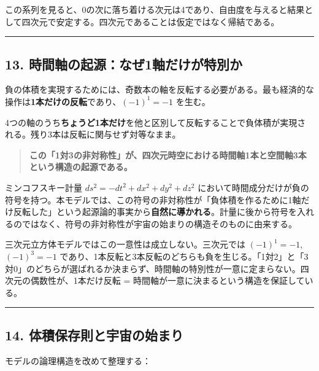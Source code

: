 \documentclass[a4paper,11pt]{ltjsarticle}
\theoremstyle{definition}
\begin{document}
この系列を見ると、0の次に落ち着ける次元は4であり、自由度を与えると結果として四次元で安定する。四次元であることは仮定ではなく帰結である。

\begin{center}\rule{0.5\linewidth}{0.5pt}\end{center}

\subsection{13.
時間軸の起源：なぜ1軸だけが特別か}\label{ux6642ux9593ux8ef8ux306eux8d77ux6e90ux306aux305c1ux8ef8ux3060ux3051ux304cux7279ux5225ux304b}

負の体積を実現するためには、奇数本の軸を反転する必要がある。最も経済的な操作は\textbf{1本だけの反転}であり、\((-1)^1 = -1\)
を生む。

4つの軸のうち\textbf{ちょうど1本だけ}を他と区別して反転することで負体積が実現される。残り3本は反転に関与せず対等なまま。

\begin{quote}
\textbf{この「1対3の非対称性」が、四次元時空における時間軸1本と空間軸3本という構造の起源である。}
\end{quote}

ミンコフスキー計量 \(ds^2 = -dt^2 + dx^2 + dy^2 + dz^2\)
において時間成分だけが負の符号を持つ。本モデルでは、この符号の非対称性が「負体積を作るために1軸だけ反転した」という起源論的事実から\textbf{自然に導かれる}。計量に後から符号を入れるのではなく、符号の非対称性が宇宙の始まりの構造そのものに由来する。

三次元立方体モデルではこの一意性は成立しない。三次元では
\((-1)^1 = -1\), \((-1)^3 = -1\)
であり、1本反転と3本反転のどちらも負を生じる。「1対2」と「3対0」のどちらが選ばれるか決まらず、時間軸の特別性が一意に定まらない。四次元の偶数性が、1本だけ反転
= 時間軸が一意に決まるという構造を保証している。

\begin{center}\rule{0.5\linewidth}{0.5pt}\end{center}

\subsection{14.
体積保存則と宇宙の始まり}\label{ux4f53ux7a4dux4fddux5b58ux5247ux3068ux5b87ux5b99ux306eux59cbux307eux308a}

モデルの論理構造を改めて整理する：
\end{document}
